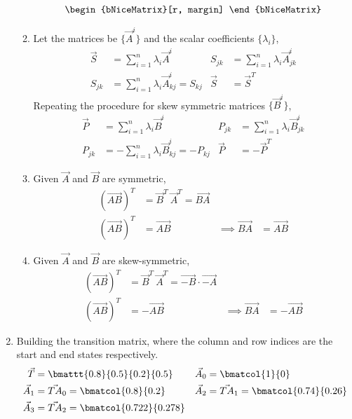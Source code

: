 \begin{enumerate}
\begin{enumerate}
\begin{align}
\begin{bNiceMatrix}[r, margin]
\end{bNiceMatrix}
\end{align}
\item Let the matrices be $ \{\vec{A}^i\} $ and the scalar coefficients
$ \{\lambda_i\} $,
\begin{align}
    \vec{S} & = \sum_{i=1}^{n} \lambda_i \vec{A}^i               &
    S_{jk}  & = \sum_{i=1}^{n} \lambda_i \vec{A}^i_{jk}            \\
    S_{jk}  & = \sum_{i=1}^{n} \lambda_i \vec{A}^i_{kj} = S_{kj} &
    \vec{S} & = \vec{S}^T
\end{align}
Repeating the procedure for skew symmetric matrices $ \{\vec{B}^i\} $,
\begin{align}
    \vec{P}   & = \sum_{i=1}^{n} \lambda_i \vec{B}^i       &
    P_{jk}    & = \sum_{i=1}^{n} \lambda_i \vec{B}^i_{jk}    \\
    P_{jk}    & = -\sum_{i=1}^{n} \lambda_i \vec{B}^i_{kj}
    = -P_{kj} &
    \vec{P}   & = -\vec{P}^T
\end{align}

\item Given $ \vec{A} $ and $ \vec{B} $ are symmetric,
\begin{align}
    (\vec{AB})^T      & = \vec{B}^T\ \vec{A}^T = \vec{BA}   \\
    (\vec{AB})^T      & = \vec{AB}                        &
    \implies \vec{BA} & = \vec{AB}
\end{align}
\item Given $ \vec{A} $ and $ \vec{B} $ are skew-symmetric,
\begin{align}
    (\vec{AB})^T      & = \vec{B}^T\ \vec{A}^T
    = \vec{-B} \cdot \vec{-A}                    \\
    (\vec{AB})^T      & = -\vec{AB}            &
    \implies \vec{BA} & = -\vec{AB}
\end{align}
\end{enumerate}

\item Building the transition matrix, where the column and row indices are the
start and end states respectively.
\begin{align}
    \vec{T}   & = \bmattt{0.8}{0.5}{0.2}{0.5}         &
    \vec{A}_0 & = \bmatcol{1}{0}                        \\
    \vec{A}_1 & = \vec{TA}_0 = \bmatcol{0.8}{0.2}     &
    \vec{A}_2 & = \vec{TA}_1 = \bmatcol{0.74}{0.26}     \\
    \vec{A}_3 & = \vec{TA}_2 = \bmatcol{0.722}{0.278} &
\end{align}


\end{enumerate}
